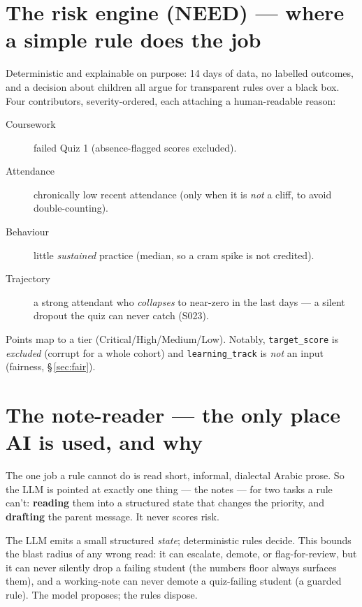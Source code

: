 \documentclass[11pt,paper=a4,parskip=half,DIV=11]{scrartcl}
\begin{document}
\section{The risk engine (NEED) --- where a simple rule does the job}
Deterministic and explainable on purpose: 14 days of data, no labelled outcomes, and a decision about
children all argue for transparent rules over a black box. Four contributors, severity-ordered, each
attaching a human-readable reason:
\begin{description}
\item[Coursework] failed Quiz 1 (absence-flagged scores excluded).
\item[Attendance] chronically low recent attendance (only when it is \emph{not} a cliff, to avoid double-counting).
\item[Behaviour] little \emph{sustained} practice (median, so a cram spike is not credited).
\item[Trajectory] a strong attendant who \emph{collapses} to near-zero in the last days --- a silent
dropout the quiz can never catch (S023).
\end{description}
Points map to a tier (Critical/High/Medium/Low). Notably, \texttt{target\_score} is \emph{excluded}
(corrupt for a whole cohort) and \texttt{learning\_track} is \emph{not} an input (fairness, \S\,\ref{sec:fair}).

\section{The note-reader --- the only place AI is used, and why}
\label{sec:llm}
The one job a rule cannot do is read short, informal, dialectal Arabic prose. So the LLM is pointed at
exactly one thing --- the notes --- for two tasks a rule can't: \textbf{reading} them into a structured
state that changes the priority, and \textbf{drafting} the parent message. It never scores risk.

\begin{why}
The LLM emits a small structured \emph{state}; deterministic rules decide. This bounds the blast radius
of any wrong read: it can escalate, demote, or flag-for-review, but it can never silently drop a
failing student (the numbers floor always surfaces them), and a working-note can never demote a
quiz-failing student (a guarded rule). The model proposes; the rules dispose.
\end{why}
\end{document}
